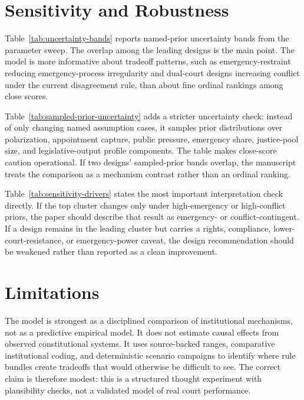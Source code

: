 \documentclass[
    journal=jlc,
    manuscript=research-article,
    year=2026,
  ]{cup-journal}
\begin{document}
\section{Sensitivity and Robustness}

Table~\ref{tab:uncertainty-bands} reports named-prior uncertainty bands from the parameter sweep. The overlap among the leading designs is the main point. The model is more informative about tradeoff patterns, such as emergency-restraint reducing emergency-process irregularity and dual-court designs increasing conflict under the current disagreement rule, than about fine ordinal rankings among close scores.





Table~\ref{tab:sampled-prior-uncertainty} adds a stricter uncertainty check: instead of only changing named assumption cases, it samples prior distributions over polarization, appointment capture, public pressure, emergency share, justice-pool size, and legislative-output profile components. The table makes close-score caution operational. If two designs' sampled-prior bands overlap, the manuscript treats the comparison as a mechanism contrast rather than an ordinal ranking.



Table~\ref{tab:sensitivity-drivers} states the most important interpretation check directly. If the top cluster changes only under high-emergency or high-conflict priors, the paper should describe that result as emergency- or conflict-contingent. If a design remains in the leading cluster but carries a rights, compliance, lower-court-resistance, or emergency-power caveat, the design recommendation should be weakened rather than reported as a clean improvement.

\clearpage

\section{Limitations}

The model is strongest as a disciplined comparison of institutional mechanisms, not as a predictive empirical model. It does not estimate causal effects from observed constitutional systems. It uses source-backed ranges, comparative institutional coding, and deterministic scenario campaigns to identify where rule bundles create tradeoffs that would otherwise be difficult to see. The correct claim is therefore modest: this is a structured thought experiment with plausibility checks, not a validated model of real court performance.
\end{document}
